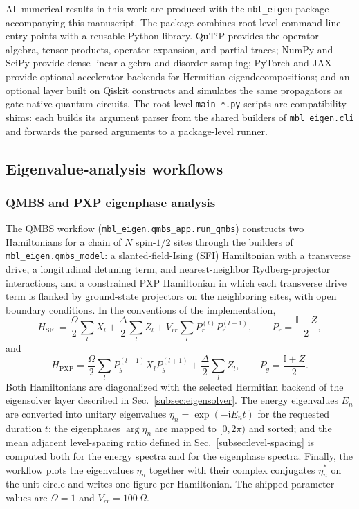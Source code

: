 \documentclass[longbibliography]{revtex4-2}
\newcommand{\im}[0]{\mathfrak{i}}
\begin{document}
All numerical results in this work are produced with the
\texttt{mbl\_eigen} package accompanying this manuscript. The package
combines root-level command-line entry points with a reusable Python
library. QuTiP provides the operator algebra, tensor products, operator
expansion, and partial traces; NumPy and SciPy provide dense linear
algebra and disorder sampling; PyTorch and JAX provide optional
accelerator backends for Hermitian eigendecompositions; and an optional
layer built on Qiskit constructs and simulates the same propagators as
gate-native quantum circuits. The root-level \texttt{main\_*.py} scripts
are compatibility shims: each builds its argument parser from the shared
builders of \texttt{mbl\_eigen.cli} and forwards the parsed arguments to
a package-level runner.

\subsection{Eigenvalue-analysis workflows}\label{subsec:workflows}

\subsubsection{QMBS and PXP eigenphase analysis}

The QMBS workflow (\texttt{mbl\_eigen.qmbs\_app.run\_qmbs}) constructs
two Hamiltonians for a chain of $N$ spin-$1/2$ sites through the builders
of \texttt{mbl\_eigen.qmbs\_model}: a slanted-field-Ising (SFI)
Hamiltonian with a transverse drive, a longitudinal detuning term, and
nearest-neighbor Rydberg-projector interactions, and a constrained PXP
Hamiltonian in which each transverse drive term is flanked by
ground-state projectors on the neighboring sites, with open boundary
conditions. In the conventions of the implementation,
\begin{equation}\label{eq:hsfi-code}
    H_{\mathrm{SFI}}
    = \frac{\Omega}{2}\sum_{l} X_{l}
    + \frac{\Delta}{2}\sum_{l} Z_{l}
    + V_{rr}\sum_{l} P_{r}^{(l)} P_{r}^{(l+1)},
    \qquad
    P_{r} = \frac{\mathbb{I} - Z}{2},
\end{equation}
and
\begin{equation}\label{eq:hpxp-code}
    H_{\mathrm{PXP}}
    = \frac{\Omega}{2}\sum_{l} P_{g}^{(l-1)} X_{l} P_{g}^{(l+1)}
    + \frac{\Delta}{2}\sum_{l} Z_{l},
    \qquad
    P_{g} = \frac{\mathbb{I} + Z}{2}.
\end{equation}
Both Hamiltonians are diagonalized with the selected Hermitian backend
of the eigensolver layer described in Sec.~\ref{subsec:eigensolver}. The
energy eigenvalues $E_n$ are converted into unitary eigenvalues
$\eta_n = \exp(-\im E_n t)$ for the requested duration $t$; the
eigenphases $\arg \eta_n$ are mapped to $[0, 2\pi)$ and sorted; and the
mean adjacent level-spacing ratio defined in
Sec.~\ref{subsec:level-spacing} is computed both for the energy spectra
and for the eigenphase spectra. Finally, the workflow plots the
eigenvalues $\eta_n$ together with their complex conjugates $\eta_n^*$
on the unit circle and writes one figure per Hamiltonian. The shipped
parameter values are $\Omega = 1$ and $V_{rr} = 100\,\Omega$.
\end{document}
